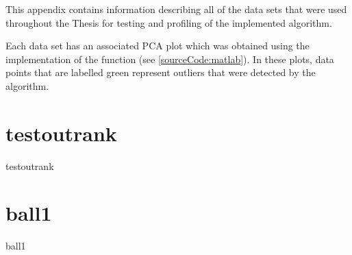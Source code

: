 This appendix contains information describing all of the data sets that were
used throughout the Thesis for testing and profiling of the implemented
algorithm.

Each data set has an associated \gls{PCA} plot which was obtained using the
 implementation of the 
function (see \autoref{sourceCode:matlab}). In these plots, data points that are
labelled \textcolor{brightGreen}{green} represent outliers that were detected by
the algorithm.

\section{testoutrank}
\label{datasets:testoutrank}
\begin{datasetDescription}{testoutrank}
\end{datasetDescription}

\section{ball1}
\label{datasets:ball1}
\begin{datasetDescription}{ball1}
\end{datasetDescription}

